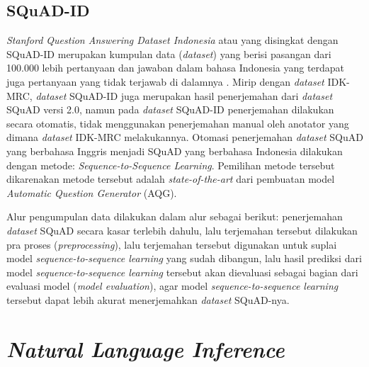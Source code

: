 \subsection{SQuAD-ID}
\label{2.2.4}
\emph{Stanford Question Answering Dataset Indonesia} atau yang disingkat dengan SQuAD-ID merupakan kumpulan data (\emph{dataset}) yang berisi pasangan dari 100.000 lebih pertanyaan dan jawaban dalam bahasa Indonesia yang terdapat juga pertanyaan yang tidak terjawab di dalamnya \citep{muis2020sequencetosequence}. Mirip dengan \emph{dataset} IDK-MRC, \emph{dataset} SQuAD-ID juga merupakan hasil penerjemahan dari \emph{dataset} SQuAD versi 2.0, namun pada \emph{dataset} SQuAD-ID penerjemahan dilakukan secara otomatis, tidak menggunakan penerjemahan manual oleh anotator yang dimana \emph{dataset} IDK-MRC melakukannya. Otomasi penerjemahan \emph{dataset} SQuAD yang berbahasa Inggris menjadi SQuAD yang berbahasa Indonesia dilakukan dengan metode: \emph{Sequence-to-Sequence Learning}. Pemilihan metode tersebut dikarenakan metode tersebut adalah \emph{state-of-the-art} dari pembuatan model \emph{Automatic Question Generator} (AQG). 

Alur pengumpulan data dilakukan dalam alur sebagai berikut: penerjemahan \emph{dataset} SQuAD secara kasar terlebih dahulu, lalu terjemahan tersebut dilakukan pra proses (\emph{preprocessing}), lalu terjemahan tersebut digunakan untuk suplai model \emph{sequence-to-sequence learning} yang sudah dibangun, lalu hasil prediksi dari model \emph{sequence-to-sequence learning} tersebut akan dievaluasi sebagai bagian dari evaluasi model (\emph{model evaluation}), agar model \emph{sequence-to-sequence learning} tersebut dapat lebih akurat menerjemahkan \emph{dataset} SQuAD-nya.

\section{\emph{Natural Language Inference}}
\label{2.3}

